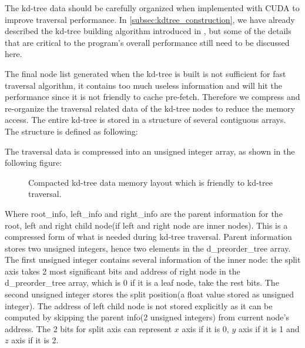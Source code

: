 The kd-tree data should be carefully organized when implemented with CUDA to improve traversal performance. In \ref{subsec:kdtree_construction}, we have already described the kd-tree building algorithm introduced in \cite{Zhou2008}, but some of the details that are critical to the program's overall performance still need to be discussed here. 

The final node list generated when the kd-tree is built is not sufficient for fast traversal algorithm, it contains too much useless information and will hit the performance since it is not friendly to cache pre-fetch. Therefore we compress and re-organize the traversal related data of the kd-tree nodes to reduce the memory access. The entire kd-tree is stored in a structure of several contiguous arrays. The structure is defined as following:



The traversal data is compressed into an unsigned integer array, as shown in the following figure:

\begin{figure}[htp]
    \centering
    \renewcommand{\thefigure}{\thechapter.\arabic{figure}}
    \caption[Compacted memory layout of constructed kd-tree data]{Compacted kd-tree data memory layout which is friendly to kd-tree traversal.}
    \label{fig:kdtree_data_memory_layout}
\end{figure}

Where root\_info, left\_info and right\_info are the parent information for the root, left and right child node(if left and right node are inner nodes). This is a compressed form of what is needed during kd-tree traversal. Parent information stores two unsigned integers, hence two elements in the d\_preorder\_tree array. The first unsigned integer contains several information of the inner node: the split axis takes 2 most significant bits and address of right node in the d\_preorder\_tree array, which is 0 if it is a leaf node, take the rest bits. The second unsigned integer stores the split position(a float value stored as unsigned integer). The address of left child node is not stored explicitly as it can be computed by skipping the parent info(2 unsigned integers) from current node's address. The 2 bits for split axis can represent \(x\) axis if it is 0, \(y\) axis if it is 1 and \(z\) axis if it is 2.

